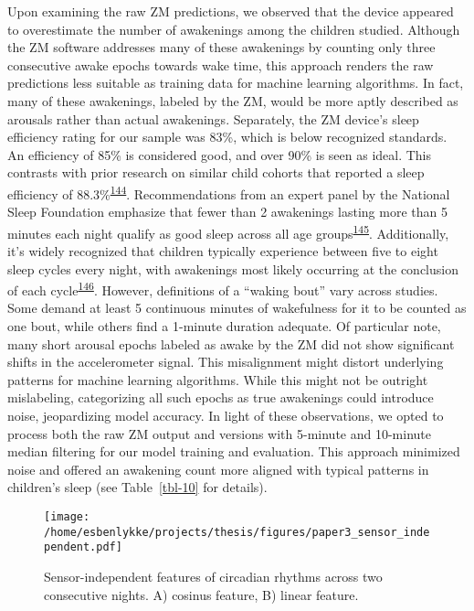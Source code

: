 \documentclass[
  10pt,
]{scrbook}
\begin{document}
Upon examining the raw ZM predictions, we observed that the device
appeared to overestimate the number of awakenings among the children
studied. Although the ZM software addresses many of these awakenings by
counting only three consecutive awake epochs towards wake time, this
approach renders the raw predictions less suitable as training data for
machine learning algorithms. In fact, many of these awakenings, labeled
by the ZM, would be more aptly described as arousals rather than actual
awakenings. Separately, the ZM device's sleep efficiency rating for our
sample was 83\%, which is below recognized standards. An efficiency of
85\% is considered good, and over 90\% is seen as ideal. This contrasts
with prior research on similar child cohorts that reported a sleep
efficiency of
88.3\%\textsuperscript{\protect\hyperlink{ref-galland_2018}{144}}.
Recommendations from an expert panel by the National Sleep Foundation
emphasize that fewer than 2 awakenings lasting more than 5 minutes each
night qualify as good sleep across all age
groups\textsuperscript{\protect\hyperlink{ref-ohayon_2017}{145}}.
Additionally, it's widely recognized that children typically experience
between five to eight sleep cycles every night, with awakenings most
likely occurring at the conclusion of each
cycle\textsuperscript{\protect\hyperlink{ref-galland_normal_2012}{146}}.
However, definitions of a ``waking bout'' vary across studies. Some
demand at least 5 continuous minutes of wakefulness for it to be counted
as one bout, while others find a 1-minute duration adequate. Of
particular note, many short arousal epochs labeled as awake by the ZM
did not show significant shifts in the accelerometer signal. This
misalignment might distort underlying patterns for machine learning
algorithms. While this might not be outright mislabeling, categorizing
all such epochs as true awakenings could introduce noise, jeopardizing
model accuracy. In light of these observations, we opted to process both
the raw ZM output and versions with 5-minute and 10-minute median
filtering for our model training and evaluation. This approach minimized
noise and offered an awakening count more aligned with typical patterns
in children's sleep (see Table~\ref{tbl-10} for details).

\begin{figure}

{\centering \texttt{[image: /home/esbenlykke/projects/thesis/figures/paper3\_sensor\_independent.pdf]}

}

\caption{\label{fig-paper3_sensor_independent}Sensor-independent
features of circadian rhythms across two consecutive nights. A) cosinus
feature, B) linear feature.}

\end{figure}
\end{document}
